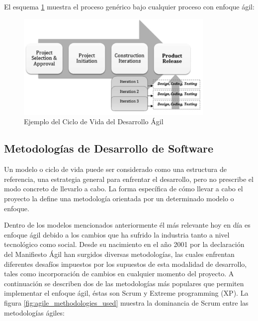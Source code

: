El esquema \ref{fig:agile_development_life_cycle} muestra el proceso genérico bajo cualquier proceso con enfoque ágil:

\begin{figure}[ht]
	\begin{center}
  \includegraphics[width=0.85\textwidth]{./figures/chapter_02/04_agile_development_life_cycle.png}
  \caption{ Ejemplo del Ciclo de Vida del Desarrollo Ágil}
  \label{fig:agile_development_life_cycle}
	\end{center}
\end{figure}

\subsection{Metodologías de Desarrollo de Software \label{sec:methodologies}}

Un modelo o ciclo de vida puede ser considerado como una estructura de referencia, una estrategia general para enfrentar el desarrollo, pero no prescribe el modo concreto de llevarlo a cabo. La forma específica de cómo llevar a cabo el proyecto la define una metodología orientada por un determinado modelo o enfoque.

Dentro de los modelos mencionados anteriormente él más relevante hoy en día es enfoque ágil debido a los cambios que ha sufrido la industria tanto a nivel tecnológico como social. Desde su nacimiento en el año 2001 por la declaración del Manifiesto Ágil han surgidos diversas metodologías, las cuales enfrentan diferentes desafíos impuestos por los supuestos de esta modalidad de desarrollo, tales como incorporación de cambios en cualquier momento del proyecto. A continuación se describen dos de las metodologías más populares que permiten implementar el enfoque ágil, éstas son Scrum y Extreme programming (XP). La figura \ref{fig:agile_methodologies_used} muestra la dominancia de Scrum entre las metodologías ágiles:

